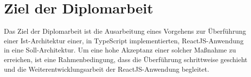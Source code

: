 \section{Ziel der Diplomarbeit}
Das Ziel der Diplomarbeit ist die Ausarbeitung eines Vorgehens zur Überführung einer Ist-Architektur einer, in TypeScript implementierten, ReactJS-Anwendung in eine Soll-Architektur. Um eine hohe Akzeptanz einer solcher Maßnahme zu erreichen, ist eine Rahmenbedingung, dass die Überführung schrittweise geschieht und die Weiterentwicklungsarbeit der ReactJS-Anwendung begleitet.

